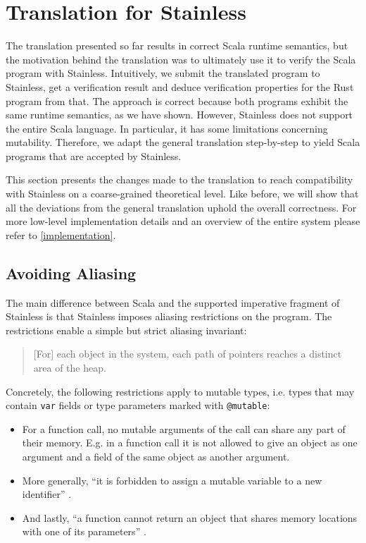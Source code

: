 \section{Translation for Stainless}

The translation presented so far results in correct Scala runtime semantics, but
the motivation behind the translation was to ultimately use it to verify the
Scala program with Stainless. Intuitively, we submit the translated program to
Stainless, get a verification result and deduce verification properties for the
Rust program from that. The approach is correct because both programs exhibit
the same runtime semantics, as we have shown. However, Stainless does not
support the entire Scala language. In particular, it has some limitations
concerning mutability. Therefore, we adapt the general translation step-by-step
to yield Scala programs that are accepted by Stainless.

This section presents the changes made to the translation to reach compatibility
with Stainless on a coarse-grained theoretical level. Like before, we will show
that all the deviations from the general translation uphold the overall
correctness. For more low-level implementation details and an overview of the
entire system please refer to \autoref{implementation}.



\subsection{Avoiding Aliasing}
\label{sec:aliasing-restrictions}

The main difference between Scala and the supported imperative fragment of
Stainless \cite[section "Imperative"]{stainless-doc} is that Stainless imposes
aliasing restrictions on the program. The restrictions enable a simple but
strict aliasing invariant:

\begin{quote}
{[}For{]} each object in the system, each path of pointers reaches a
distinct area of the heap. \cite[p.~59]{regb}
\end{quote}

Concretely, the following restrictions apply to mutable types, i.e. types that
may contain \lstinline!var! fields or type parameters marked with
\lstinline!@mutable!:

\begin{itemize}
\tightlist
\item
  For a function call, no mutable arguments of the call can share any
  part of their memory. E.g. in a function call it is not allowed to
  give an object as one argument and a field of the same object as
  another argument.
\item
  More generally, ``it is forbidden to assign a mutable variable to a
  new identifier'' \cite[p.~59]{regb}.
\item
  And lastly, ``a function cannot return an object that shares memory
  locations with one of its parameters'' \cite[p.~59]{regb}.
\end{itemize}

